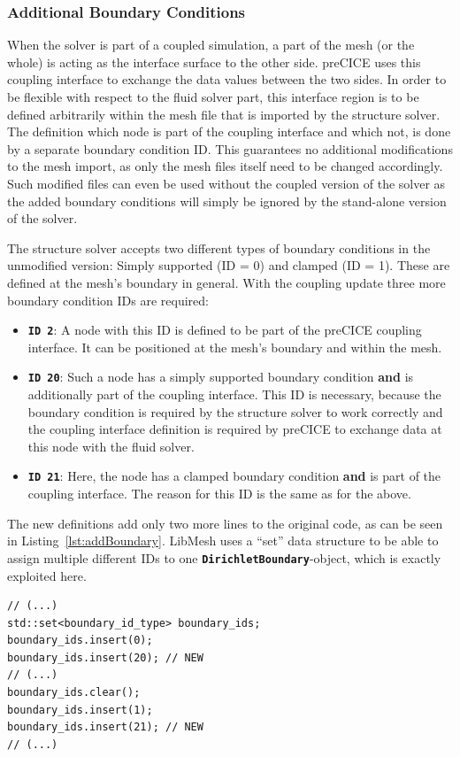   \subsubsection{Additional Boundary Conditions}\label{sec:Coupl-Impl-BCs}
   When the solver is part of a coupled simulation, a part of the mesh (or the whole) is acting as the interface surface to the other side. preCICE uses this coupling interface to exchange the data values between the two sides. In order to be flexible with respect to the fluid solver part, this interface region is to be defined arbitrarily within the mesh file that is imported by the structure solver. The definition which node is part of the coupling interface and which not, is done by a separate boundary condition ID. This guarantees no additional modifications to the mesh import, as only the mesh files itself need to be changed accordingly. Such modified files can even be used without the coupled version of the solver as the added boundary conditions will simply be ignored by the stand-alone version of the solver.
   
   The structure solver accepts two different types of boundary conditions in the unmodified version: Simply supported (ID = 0) and clamped (ID = 1). These are defined at the mesh's boundary in general. With the coupling update three more boundary condition IDs are required:
   \begin{itemize}
  	\item \textbf{\texttt{ID 2}}: A node with this ID is defined to be part of the preCICE coupling interface. It can be positioned at the mesh's boundary and within the mesh.
  	\item \textbf{\texttt{ID 20}}: Such a node has a simply supported boundary condition \textbf{and} is additionally part of the coupling interface. This ID is necessary, because the boundary condition is required by the structure solver to work correctly and the coupling interface definition is required by preCICE to exchange data at this node with the fluid solver.
  	\item \textbf{\texttt{ID 21}}: Here, the node has a clamped boundary condition \textbf{and} is part of the coupling interface. The reason for this ID is the same as for the above.
   \end{itemize}
   
   The new definitions add only two more lines to the original code, as can be seen in Listing~\ref{lst:addBoundary}. LibMesh uses a ``set'' data structure to be able to assign multiple different IDs to one \texttt{\textbf{DirichletBoundary}}-object, which is exactly exploited here.
\begin{lstlisting}[caption=Additional boundary condition IDs,label=lst:addBoundary,keepspaces=true]
// (...)
std::set<boundary_id_type> boundary_ids;
boundary_ids.insert(0);
boundary_ids.insert(20); // NEW
// (...)
boundary_ids.clear();
boundary_ids.insert(1);
boundary_ids.insert(21); // NEW
// (...)
\end{lstlisting}


